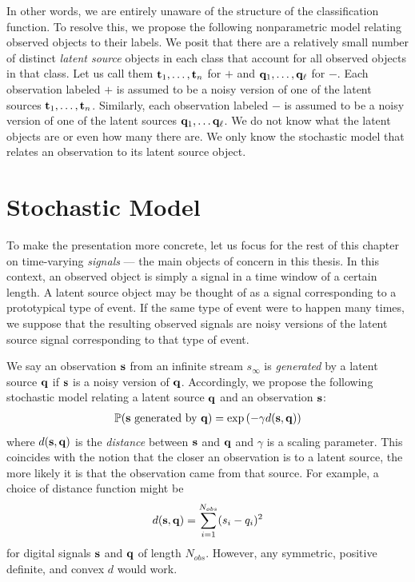 In other words, we are entirely unaware of the structure of the classification
function. To resolve this, we propose the following nonparametric model relating
observed objects to their labels. We posit that there are a relatively small
number of distinct {\em latent source} objects in each class that account for
all observed objects in that class. Let us call them $\mathbf t_1, \dots, \mathbf t_n$
for $+$ and $\mathbf q_1, \dots, \mathbf q_{\ell}$ for $-$. Each observation labeled $+$
is assumed to be a noisy version of one of the latent sources $\mathbf t_1, \dots,
\mathbf t_n$. Similarly, each observation labeled $-$ is assumed to be a noisy
version of one of the latent sources $\mathbf q_1, \dots \mathbf q_{\ell}$. We do not
know what the latent objects are or even how many there are. We only know the
stochastic model that relates an observation to its latent source object.

\section{Stochastic Model}
To make the presentation more concrete, let us focus for the rest of this
chapter on time-varying {\em signals} --- the main objects of concern in this
thesis. In this context, an observed object is simply a signal in a time window
of a certain length.  A latent source object may be thought of as a signal
corresponding to a prototypical type of event. If the same type of event were to
happen many times, we suppose that the resulting observed signals are noisy
versions of the latent source signal corresponding to that type of event.

We say an observation $\mathbf s$ from an infinite stream $s_{\infty}$ is {\em
  generated} by a latent source $\mathbf q$ if $\mathbf s$ is a noisy version of $\mathbf
q$. Accordingly, we propose the following stochastic model relating a latent
source $\mathbf q$ and an observation $\mathbf s$:
\begin{gather}
\mathbb{P}(\mathbf s \text{ generated by } \mathbf q) = \exp\left(-\gamma d(\mathbf s,\mathbf q) \right)
\end{gather}
where $d(\mathbf s, \mathbf q)$ is the {\em distance} between $\mathbf s$ and $\mathbf q$ and $\gamma$ is a
scaling parameter. This coincides with the notion that the closer an observation
is to a latent source, the more likely it is that the observation came from that
source. For example, a choice of distance function might be
\begin{gather}
d(\mathbf s,\mathbf q) = \sum_{i=1}^{N_{obs}} (s_i - q_i)^2
\end{gather}
for digital signals $\mathbf s$ and $\mathbf q$ of length $N_{obs}$. However, any
symmetric, positive definite, and convex $d$ would work.

